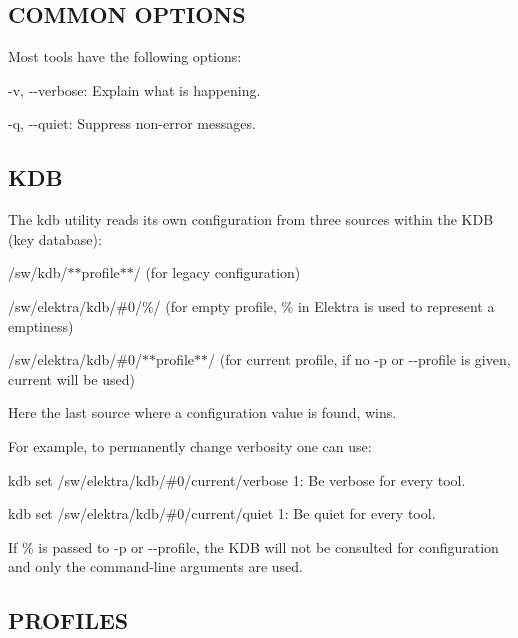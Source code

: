 \subsection*{C\+O\+M\+M\+ON O\+P\+T\+I\+O\+NS}

Most tools have the following options\+:


\begin{DoxyItemize}
\item {\ttfamily -\/v}, {\ttfamily -\/-\/verbose}\+: Explain what is happening.
\item {\ttfamily -\/q}, {\ttfamily -\/-\/quiet}\+: Suppress non-\/error messages.
\end{DoxyItemize}

\subsection*{K\+DB}

The {\ttfamily kdb} utility reads its own configuration from three sources within the K\+DB (key database)\+:


\begin{DoxyEnumerate}
\item /sw/kdb/$\ast$$\ast$profile$\ast$$\ast$/ (for legacy configuration)
\item /sw/elektra/kdb/\#0/\%/ (for empty profile, {\ttfamily \%} in Elektra is used to represent a emptiness)
\item /sw/elektra/kdb/\#0/$\ast$$\ast$profile$\ast$$\ast$/ (for current profile, if no {\ttfamily -\/p} or {\ttfamily -\/-\/profile} is given, {\ttfamily current} will be used)
\end{DoxyEnumerate}

Here the last source where a configuration value is found, wins.

For example, to permanently change verbosity one can use\+:


\begin{DoxyItemize}
\item {\ttfamily kdb set /sw/elektra/kdb/\#0/current/verbose 1}\+: Be verbose for every tool.
\item {\ttfamily kdb set /sw/elektra/kdb/\#0/current/quiet 1}\+: Be quiet for every tool.
\end{DoxyItemize}

If {\ttfamily \%} is passed to {\ttfamily -\/p} or {\ttfamily -\/-\/profile}, the K\+DB will not be consulted for configuration and only the command-\/line arguments are used.

\subsection*{P\+R\+O\+F\+I\+L\+ES}

